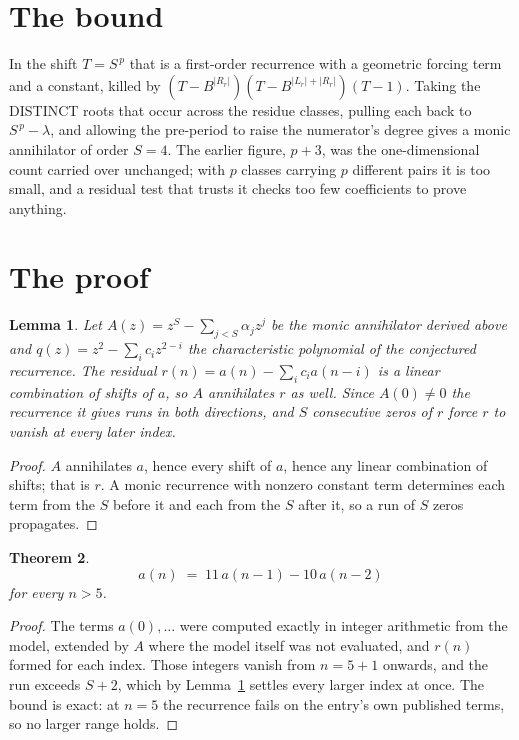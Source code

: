 \documentclass[11pt,a4paper]{article}
\theoremstyle{plain}
\newtheorem{theorem}{Theorem}
\newtheorem{lemma}[theorem]{Lemma}
\theoremstyle{definition}
\begin{document}
\section{The bound}

In the shift $T=S^{\,p}$ that is a first-order recurrence with a geometric forcing term and a
constant, killed by $(T-B^{|R_r|})(T-B^{|L_r|+|R_r|})(T-1)$. Taking the DISTINCT roots that
occur across the residue classes, pulling each back to $S^{\,p}-\lambda$, and allowing the
pre-period to raise the numerator's degree gives a monic annihilator of order $S=4$. The
earlier figure, $p+3$, was the one-dimensional count carried over unchanged; with $p$ classes
carrying $p$ different pairs it is too small, and a residual test that trusts it checks too few
coefficients to prove anything.

\section{The proof}

\begin{lemma}\label{lem:crit}
Let $A(z)=z^S-\sum_{j<S}\alpha_jz^{j}$ be the monic annihilator derived above and
$q(z)=z^{2}-\sum_ic_iz^{2-i}$ the characteristic polynomial of the conjectured
recurrence. The residual $r(n)=a(n)-\sum_ic_ia(n-i)$ is a linear combination of shifts of $a$,
so $A$ annihilates $r$ as well. Since $A(0)\ne0$ the recurrence it gives runs in both
directions, and $S$ consecutive zeros of $r$ force $r$ to vanish at every later index.
\end{lemma}

\begin{proof}
$A$ annihilates $a$, hence every shift of $a$, hence any linear combination of shifts; that is
$r$. A monic recurrence with nonzero constant term determines each term from the $S$ before it
and each from the $S$ after it, so a run of $S$ zeros propagates.
\end{proof}

\begin{theorem}
\[
a(n)\;=\;11\,a(n-1) - 10\,a(n-2)
\]
for every $n>5$.
\end{theorem}

\begin{proof}
The terms $a(0),\dots$ were computed exactly in integer arithmetic from the model, extended by
$A$ where the model itself was not evaluated, and $r(n)$ formed for each index. Those integers
vanish from $n=5+1$ onwards, and the run exceeds $S+2$, which by
Lemma~\ref{lem:crit} settles every larger index at once. The bound is exact: at $n=5$ the recurrence fails on the entry's own published terms, so no larger range holds.
\end{proof}
\end{document}
